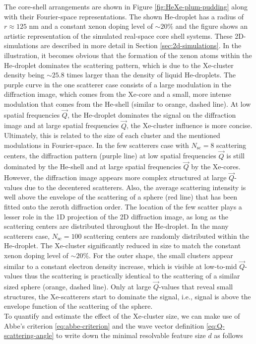 The core-shell arrangements are shown in Figure \ref{fig:HeXe-plum-pudding} along with their Fourier-space representations. The shown He-droplet has a radius of $r\approx 125$ nm and a constant xenon doping level of $\sim 20\%$ and the figure shows an artistic representation of the simulated real-space core shell systems. These 2D-simulations are described in more detail in Section \ref{sec:2d-simulations}. In the illustration, it becomes obvious that the formation of the xenon atoms within the He-droplet dominates the scattering pattern, which is due to the Xe-cluster density being $\sim 25.8$ times larger than the density of liquid He-droplets. The purple curve in the one scatterer case consists of a large modulation in the diffraction image, which comes from the Xe-core and a small, more intense modulation that comes from the He-shell (similar to orange, dashed line). At low spatial frequencies $\vec{Q}$, the He-droplet dominates the signal on the diffraction image and at large spatial frequencies $\vec{Q}$, the Xe-cluster influence is more concise. Ultimately, this is related to the size of each cluster and the mentioned modulations in Fourier-space. In the few scatterers case with $N_{\text{sc}}=8$ scattering centers, the diffraction pattern (purple line) at low spatial frequencies $\vec{Q}$ is still dominated by the He-shell and at large spatial frequencies $\vec{Q}$ by the Xe-cores. However, the diffraction image appears more complex structured at large $\vec{Q}$-values due to the decentered scatterers. Also, the average scattering intensity is well above the envelope of the scattering of a sphere (red line) that has been fitted onto the zeroth diffraction order. The location of the few scatter plays a lesser role in the 1D projection of the 2D diffraction image, as long as the scattering centers are distributed throughout the He-droplet. In the many scatterers case, $N_{\text{sc}}=100$ scattering centers are randomly distributed within the He-droplet. The Xe-cluster significantly reduced in size to match the constant xenon doping level of $\sim 20 \%$. For the outer shape, the small clusters appear similar to a constant electron density increase, which is visible at low-to-mid $\vec{Q}$-values thus the scattering is practically identical to the scattering of a similar sized sphere (orange, dashed line). Only at large $\vec{Q}$-values that reveal small structures, the Xe-scatterers start to dominate the signal, i.e., signal is above the envelope function of the scattering of the sphere.\\
To quantify and estimate the effect of the Xe-cluster size, we can make use of Abbe's criterion \eqref{eq:abbe-criterion} and the wave vector definition \eqref{eq:Q-scattering-angle} to write down the minimal resolvable feature size $d$ as follows
